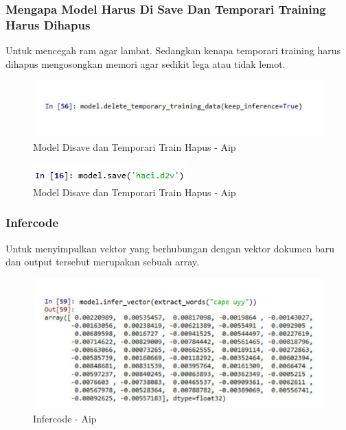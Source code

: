 \subsubsection{Mengapa Model Harus Di Save Dan Temporari Training Harus Dihapus}
Untuk mencegah ram agar lambat. Sedangkan kenapa temporari training harus dihapus mengosongkan memori agar sedikit lega atau tidak lemot.
\begin{figure}[!hbtp]
\centering
\includegraphics[scale=0.3]{figures/AIP/e24.PNG}
\caption{Model Disave dan Temporari Train Hapus - Aip}
\label{Model Disave dan Temporari Train Hapus - Aip}
\end{figure}

\begin{figure}[!hbtp]
\centering
\includegraphics[scale=0.3]{figures/AIP/e25.PNG}
\caption{Model Disave dan Temporari Train Hapus - Aip}
\label{Model Disave dan Temporari Train Hapus - Aip}
\end{figure}

\subsubsection{Infercode}
Untuk menyimpulkan vektor yang berhubungan dengan vektor dokumen baru dan output tersebut merupakan sebuah array.
\begin{figure}[!hbtp]
\centering
\includegraphics[scale=0.3]{figures/AIP/e26.PNG}
\caption{Infercode - Aip}
\label{Infercode - Aip}
\end{figure}


